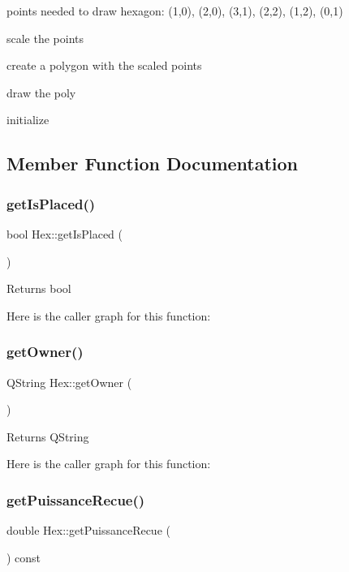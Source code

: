 points needed to draw hexagon\+: (1,0), (2,0), (3,1), (2,2), (1,2), (0,1)

scale the points

create a polygon with the scaled points

draw the poly

initialize 

\subsection{Member Function Documentation}
\mbox{\label{class_hex_ab3088c379066efac7e39fd24cb7a5f3d}} 
\subsubsection{\texorpdfstring{getIsPlaced()}{getIsPlaced()}}
{\footnotesize\ttfamily bool Hex\+::get\+Is\+Placed (\begin{DoxyParamCaption}{ }\end{DoxyParamCaption})}

\begin{DoxyReturn}{Returns}
bool 
\end{DoxyReturn}
Here is the caller graph for this function\+:
\mbox{\label{class_hex_a5e3c6d3cba025b51129ac90500d80a8f}} 
\subsubsection{\texorpdfstring{getOwner()}{getOwner()}}
{\footnotesize\ttfamily Q\+String Hex\+::get\+Owner (\begin{DoxyParamCaption}{ }\end{DoxyParamCaption})}

\begin{DoxyReturn}{Returns}
Q\+String 
\end{DoxyReturn}
Here is the caller graph for this function\+:
\mbox{\label{class_hex_acc6abb4c09107a205c7bc3a01506385d}} 
\subsubsection{\texorpdfstring{getPuissanceRecue()}{getPuissanceRecue()}}
{\footnotesize\ttfamily double Hex\+::get\+Puissance\+Recue (\begin{DoxyParamCaption}{ }\end{DoxyParamCaption}) const}



